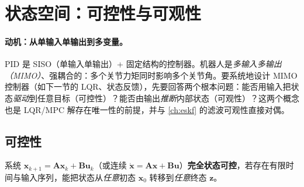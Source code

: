 \section{状态空间：可控性与可观性}
\label{sec:ctrl-statespace}

\paragraph{动机：从单输入单输出到多变量。}
PID 是 SISO（单输入单输出）+ 固定结构的控制器。机器人是\emph{多输入多输出（MIMO）}、强耦合的：多个关节力矩同时影响多个关节角。要系统地设计 MIMO 控制器（如下一节的 LQR、状态反馈），先要回答两个根本问题：能否用输入把状态\emph{驱动}到任意目标（可控性）？能否由输出\emph{推断}内部状态（可观性）？这两个概念也是 LQR/MPC 解存在唯一性的前提，并与 \cref{ch:eskf} 的滤波可观性直接对偶。

\subsection{可控性}
\label{sec:ctrl-controllability}

\begin{definition}[完全状态可控]
\label{def:ctrl-controllable}
系统 $\mathbf{x}_{k+1}=\mathbf{A}\mathbf{x}_k+\mathbf{B}\mathbf{u}_k$（或连续 $\dot{\mathbf{x}}=\mathbf{A}\mathbf{x}+\mathbf{B}\mathbf{u}$）\textbf{完全状态可控}，若存在有限时间与输入序列，能把状态从\emph{任意}初态 $\mathbf{x}_0$ 转移到\emph{任意}终态 $\mathbf{z}$。
\end{definition}

